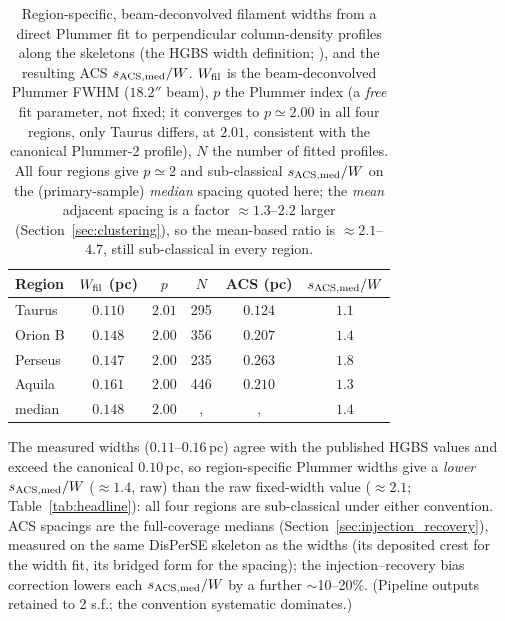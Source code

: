 \documentclass[usenatbib,twoside,twocolumn]{mnras}
\begin{document}
\begin{table}
\caption{Region-specific, beam-deconvolved filament widths from a direct Plummer fit to perpendicular column-density profiles along the skeletons (the HGBS width definition; \citealt{Arzoumanian2019}), and the resulting ACS $s_{\rm ACS,med}/W$. $W_{\rm fil}$ is the beam-deconvolved Plummer FWHM ($18.2''$ beam), $p$ the Plummer index (a \emph{free} fit parameter, not fixed; it converges to $p\simeq2.00$ in all four regions, only Taurus differs, at $2.01$, consistent with the canonical Plummer-2 profile), $N$ the number of fitted profiles. All four regions give $p\simeq2$ and sub-classical $s_{\rm ACS,med}/W$ on the (primary-sample) \emph{median} spacing quoted here; the \emph{mean} adjacent spacing is a factor $\approx1.3$--$2.2$ larger (Section~\ref{sec:clustering}), so the mean-based ratio is $\approx2.1$--$4.7$, still sub-classical in every region.}
\label{tab:widths}
\footnotesize
\setlength{\tabcolsep}{3pt}
\begin{tabular}{p{1.7cm}ccccc}
\toprule
Region & $W_{\rm fil}$ (pc) & $p$ & $N$ & ACS (pc) & $s_{\rm ACS,med}/W$ \\
\midrule
Taurus  & $0.110$ & $2.01$ & 295 & $0.124$ & $1.1$ \\
Orion B & $0.148$ & $2.00$ & 356 & $0.207$ & $1.4$ \\
Perseus & $0.147$ & $2.00$ & 235 & $0.263$ & $1.8$ \\
Aquila  & $0.161$ & $2.00$ & 446 & $0.210$ & $1.3$ \\
\midrule
median  & $0.148$ & $2.00$ &, &, & $1.4$ \\
\bottomrule
\end{tabular}
\par\vspace{2pt}
\footnotesize The measured widths ($0.11$--$0.16$\,pc) agree with the published HGBS values and exceed the canonical $0.10$\,pc, so region-specific Plummer widths give a \emph{lower} $s_{\rm ACS,med}/W$ ($\approx1.4$, raw) than the raw fixed-width value ($\approx2.1$; Table~\ref{tab:headline}): all four regions are sub-classical under either convention. ACS spacings are the full-coverage medians (Section~\ref{sec:injection_recovery}), measured on the same DisPerSE skeleton as the widths (its deposited crest for the width fit, its bridged form for the spacing); the injection--recovery bias correction lowers each $s_{\rm ACS,med}/W$ by a further $\sim$10--20\%. (Pipeline outputs retained to 2 s.f.; the convention systematic dominates.)
\end{table}
\end{document}
